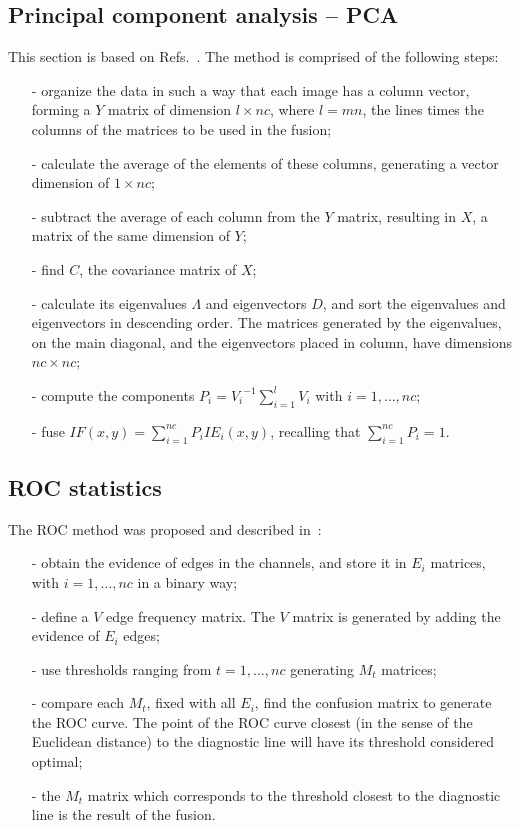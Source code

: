\documentclass[conference]{IEEEtran}
\begin{document}
\subsection{Principal component analysis -- PCA}

This section is based on Refs.~\cite{n_r,mit}.
The method is comprised of the following steps:
\begin{itemize}
\item[-] organize the data in such a way that each image has a column vector, forming a $Y$ matrix of dimension $l\times nc$, where $l=m n$, the lines times the columns of the matrices to be used in the fusion;
\item[-] calculate the average of the elements of these columns, generating a vector dimension of $1\times nc$;
\item[-] subtract the average of each column from the $Y$ matrix, resulting in $X$, a matrix of the same dimension of $Y$; 
\item[-] find $C$, the covariance matrix of $X$;
\item[-] calculate its eigenvalues $\Lambda$ and eigenvectors $D$, and sort the eigenvalues and eigenvectors in descending order. The matrices generated by the eigenvalues, on the main diagonal, and the eigenvectors placed in column, have dimensions $nc\times nc$;
\item[-] compute the components $P_i={V_i}^{-1}{\sum_{i=1}^l V_i}$ with $i=1,\dots,nc$;
\item[-] fuse $IF(x,y)=\sum_{i=1}^{nc}P_iIE_i(x,y)$, recalling that $\sum_{i=1}^{nc}P_i=1$.
\end{itemize}

\subsection{ROC statistics}

The ROC method was proposed and described in~\cite{gs,fawcett}:
\begin{itemize}
\item[-] obtain the evidence of edges in the channels, and store it in $E_i$ matrices, with $i=1,\dots,nc$ in a binary way;
\item[-] define a $V$ edge frequency matrix. The $V$ matrix is generated by adding the evidence of $E_i$ edges;
\item[-] use thresholds ranging from $t=1,\dots,nc$ generating $M_t$ matrices;
\item[-] compare each $M_t$, fixed with all $E_i$, find the confusion matrix to generate the ROC curve. The point of the ROC curve closest (in the sense of the Euclidean distance) to the diagnostic line will have its threshold considered optimal;
\item[-] the $M_t$ matrix which corresponds to the threshold closest to the diagnostic line is the result of the fusion.
\end{itemize}
\end{document}
